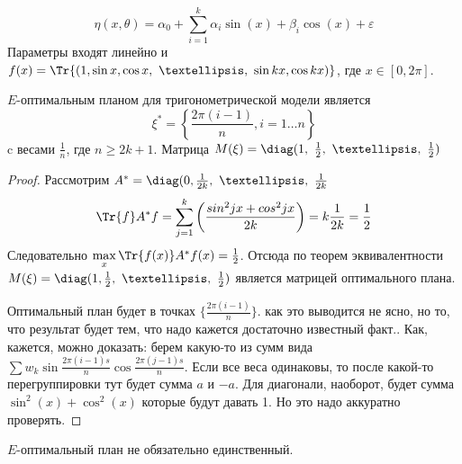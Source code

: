 $$ \eta(x, \theta) = \alpha_0 + \sum\limits_{i=1}^k \alpha_i \sin(x) + \beta_i \cos(x) + \varepsilon$$
Параметры входят линейно и $f(x) = \Tr{(1, \sin x, \cos x, …, \sin kx, \cos kx)}$, где $x \in [0, 2\pi]$.  

\begin{thm}
$E$-оптимальным планом для тригонометрической модели является 
$$ \xi^{*} = \left\{ \frac{2\pi(i-1)}{n}, i = 1…n\right\}$$
c весами $\frac{1}{n}$, где $n \geq 2k + 1$.
Матрица $M(\xi) = \diag(1, \frac{1}{2}, …, \frac{1}{2})$
\end{thm}
\begin{proof}
Рассмотрим $A^{*}=\diag(0,\frac{1}{2k}, …, \frac{1}{2k}$
$$\Tr{f}A^*f = \sum\limits_{j=1}^k \left(\frac{sin^2 jx + cos^2jx}{2k}\right)= k \frac{1}{2k} = \frac{1}{2}$$
Следовательно $\max\limits_x \Tr{f(x)}A^{*}f(x) = \frac{1}{2}$. Отсюда по теорем эквивалентности $M(\xi) = \diag(1, \frac{1}{2}, …, \frac{1}{2})$ является матрицей оптимального плана. 

Оптимальный план будет в точках $\{ \frac{2\pi(i-1)}{n}\}$. {\color{blue} как это выводится не ясно, но то, что результат будет тем, что надо кажется достаточно известный факт.}. 
{\color{blue} Как, кажется, можно доказать: берем какую-то из сумм вида $\sum w_k \sin\frac{2\pi(i-1)s}{n} \cos\frac{2\pi(j-1)s}{n}$. Если все веса одинаковы, то после какой-то перегруппировки тут будет сумма $a$ и $-a$. Для диагонали, наоборот, будет сумма $\sin^2(x) + \cos^2(x)$ которые будут давать 1. Но это надо аккуратно проверять.} 
\end{proof}

\begin{note}
$E$-оптимальный план не обязательно единственный. 
\end{note}

